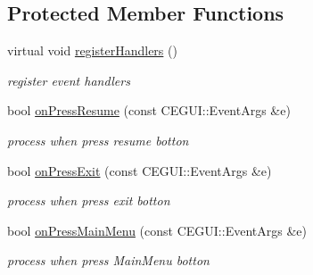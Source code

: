 \subsection*{Protected Member Functions}
\begin{DoxyCompactItemize}
\item 
virtual void \hyperlink{class_n_c_t_u_1_1_game_menu_window_accc2e422a42829a2ff7dc6c1d4110436}{register\+Handlers} ()\hypertarget{class_n_c_t_u_1_1_game_menu_window_accc2e422a42829a2ff7dc6c1d4110436}{}\label{class_n_c_t_u_1_1_game_menu_window_accc2e422a42829a2ff7dc6c1d4110436}

\begin{DoxyCompactList}\small\item\em register event handlers \end{DoxyCompactList}\item 
bool \hyperlink{class_n_c_t_u_1_1_game_menu_window_a47e996ebace14a24d335ef9f5223fe1d}{on\+Press\+Resume} (const C\+E\+G\+U\+I\+::\+Event\+Args \&e)\hypertarget{class_n_c_t_u_1_1_game_menu_window_a47e996ebace14a24d335ef9f5223fe1d}{}\label{class_n_c_t_u_1_1_game_menu_window_a47e996ebace14a24d335ef9f5223fe1d}

\begin{DoxyCompactList}\small\item\em process when press resume botton \end{DoxyCompactList}\item 
bool \hyperlink{class_n_c_t_u_1_1_game_menu_window_aaeeccf9f45968a40875537f14b10b3a2}{on\+Press\+Exit} (const C\+E\+G\+U\+I\+::\+Event\+Args \&e)\hypertarget{class_n_c_t_u_1_1_game_menu_window_aaeeccf9f45968a40875537f14b10b3a2}{}\label{class_n_c_t_u_1_1_game_menu_window_aaeeccf9f45968a40875537f14b10b3a2}

\begin{DoxyCompactList}\small\item\em process when press exit botton \end{DoxyCompactList}\item 
bool \hyperlink{class_n_c_t_u_1_1_game_menu_window_a0bf12a3562e057091ea60c21d5199d0a}{on\+Press\+Main\+Menu} (const C\+E\+G\+U\+I\+::\+Event\+Args \&e)\hypertarget{class_n_c_t_u_1_1_game_menu_window_a0bf12a3562e057091ea60c21d5199d0a}{}\label{class_n_c_t_u_1_1_game_menu_window_a0bf12a3562e057091ea60c21d5199d0a}

\begin{DoxyCompactList}\small\item\em process when press Main\+Menu botton \end{DoxyCompactList}\end{DoxyCompactItemize}
